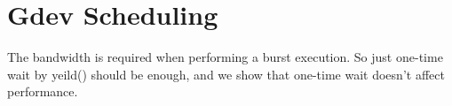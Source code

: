 \section{Gdev Scheduling}
\label{sec:scheduling}

The bandwidth is required when performing a burst execution.
So just one-time wait by yeild() should be enough, and we show that
one-time wait doesn't affect performance.
